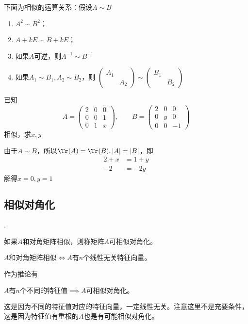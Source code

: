 下面为相似的运算关系：假设$A\sim B$
\begin{enumerate}[(1)]
    \item $A^2 \sim B^2$；
    \item $A+kE \sim B + kE$；
    \item 如果$A$可逆，则$A^{-1}\sim B^{-1}$
    \item 如果$A_1\sim B_1, A_2\sim B_2$，则
          $
              \begin{pmatrix}
                  A_1 &     \\
                      & A_2
              \end{pmatrix}
              \sim
              \begin{pmatrix}
                  B_1 &     \\
                      & B_2
              \end{pmatrix}
          $
\end{enumerate}

\begin{example}
    已知
    \[
        A =
        \begin{pmatrix}
            2 & 0 & 0 \\
            0 & 0 & 1 \\
            0 & 1 & x
        \end{pmatrix}
        ,\qquad
        B =
        \begin{pmatrix}
            2 & 0 & 0  \\
            0 & y & 0  \\
            0 & 0 & -1
        \end{pmatrix}
    \]
    相似，求$x,y$
\end{example}
\begin{solution}
    由于$A\sim B$，所以$\Tr(A)=\Tr(B),|A|=|B|$，即
    \begin{align*}
        2+x & = 1+y \\
        -2  & = -2y
    \end{align*}
    解得$x=0,y=1$
\end{solution}

\subsection{相似对角化}
.
\begin{definition}
    如果$A$和对角矩阵相似，则称矩阵$A$可相似对角化。
\end{definition}

\begin{theorem}
    $A$和对角矩阵相似$\iff A$有$n$个线性无关特征向量。
\end{theorem}
作为推论有
\begin{theorem}
    $A$有$n$个不同的特征值$\implies A$可相似对角化。
\end{theorem}
这是因为不同的特征值对应的特征向量，一定线性无关。注意这里不是充要条件，这是因为特征值有重根的$A$也是有可能相似对角化。

